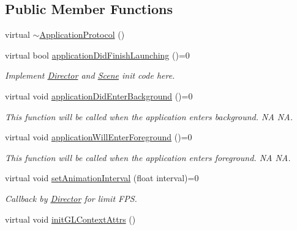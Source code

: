 \subsection*{Public Member Functions}
\begin{DoxyCompactItemize}
\item 
virtual \hyperlink{classApplicationProtocol_aad06d82865e90137c243dd987d7ab1c4}{$\sim$\+Application\+Protocol} ()
\item 
virtual bool \hyperlink{classApplicationProtocol_a8f44759d0b686ababcbb15d106b08ca4}{application\+Did\+Finish\+Launching} ()=0
\begin{DoxyCompactList}\small\item\em Implement \hyperlink{classDirector}{Director} and \hyperlink{classScene}{Scene} init code here. \end{DoxyCompactList}\item 
\mbox{\label{classApplicationProtocol_af155150f74e05460a3b815247cbe5cbc}} 
virtual void \hyperlink{classApplicationProtocol_af155150f74e05460a3b815247cbe5cbc}{application\+Did\+Enter\+Background} ()=0
\begin{DoxyCompactList}\small\item\em This function will be called when the application enters background.  NA  NA. \end{DoxyCompactList}\item 
\mbox{\label{classApplicationProtocol_ac17dbad28d975d778055bacacf2d8ca9}} 
virtual void \hyperlink{classApplicationProtocol_ac17dbad28d975d778055bacacf2d8ca9}{application\+Will\+Enter\+Foreground} ()=0
\begin{DoxyCompactList}\small\item\em This function will be called when the application enters foreground.  NA  NA. \end{DoxyCompactList}\item 
virtual void \hyperlink{classApplicationProtocol_ac69ac0f01aaba7cc8654ec7cce4eb88f}{set\+Animation\+Interval} (float interval)=0
\begin{DoxyCompactList}\small\item\em Callback by \hyperlink{classDirector}{Director} for limit F\+PS. \end{DoxyCompactList}\item 
virtual void \hyperlink{classApplicationProtocol_a4b83bcd1a065b1d745cbc3f358c45878}{init\+G\+L\+Context\+Attrs} ()

\end{DoxyCompactItemize}

